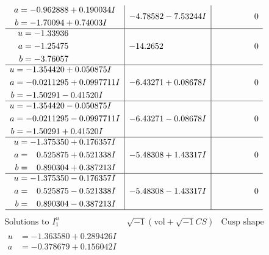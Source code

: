 \documentclass[1p]{elsarticle_modified}
\theoremstyle{definition}
\newcommand{\I}{\sqrt{-1}}
\begin{document}
$$\begin{array}{c|c|c}
\begin{aligned}
a &= -0.962888 + 0.190034 I \\
b &= -1.70094 + 0.74003 I\end{aligned}
 & -4.78582 - 7.53244 I & \phantom{-0.000000 } 0 \\ \hline\begin{aligned}
u &= -1.33936\phantom{ +0.000000I} \\
a &= -1.25475\phantom{ +0.000000I} \\
b &= -3.76057\phantom{ +0.000000I}\end{aligned}
 & -14.2652\phantom{ +0.000000I} & \phantom{-0.000000 } 0 \\ \hline\begin{aligned}
u &= -1.354420 + 0.050875 I \\
a &= -0.0211295 + 0.0997711 I \\
b &= -1.50291 - 0.41520 I\end{aligned}
 & -6.43271 + 0.08678 I & \phantom{-0.000000 } 0 \\ \hline\begin{aligned}
u &= -1.354420 - 0.050875 I \\
a &= -0.0211295 - 0.0997711 I \\
b &= -1.50291 + 0.41520 I\end{aligned}
 & -6.43271 - 0.08678 I & \phantom{-0.000000 } 0 \\ \hline\begin{aligned}
u &= -1.375350 + 0.176357 I \\
a &= \phantom{-}0.525875 + 0.521338 I \\
b &= \phantom{-}0.890304 + 0.387213 I\end{aligned}
 & -5.48308 + 1.43317 I & \phantom{-0.000000 } 0 \\ \hline\begin{aligned}
u &= -1.375350 - 0.176357 I \\
a &= \phantom{-}0.525875 - 0.521338 I \\
b &= \phantom{-}0.890304 - 0.387213 I\end{aligned}
 & -5.48308 - 1.43317 I & \phantom{-0.000000 } 0\\
 \hline 
 \end{array}$$\newpage$$\begin{array}{c|c|c}  
\text{Solutions to }I^u_{1}& \I (\text{vol} + \sqrt{-1}CS) & \text{Cusp shape}\\
 \hline 
\begin{aligned}
u &= -1.363580 + 0.289426 I \\
a &= -0.378679 + 0.156042 I \\

\end{aligned}
\end{array}$$
\end{document}
